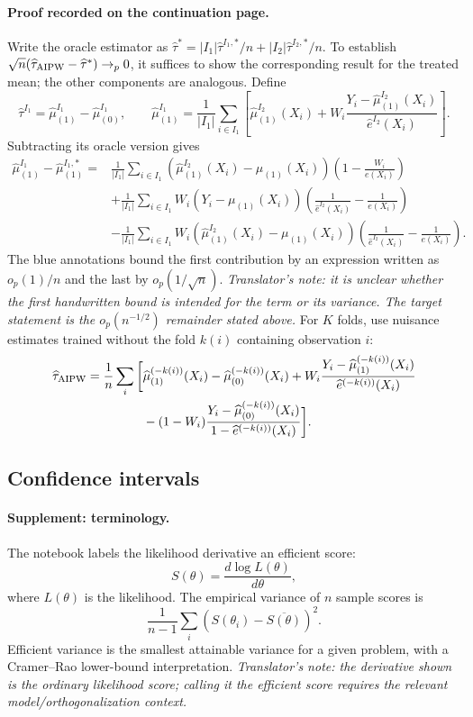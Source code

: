 \paragraph{Proof recorded on the continuation page.}
Write the oracle estimator as
$\widehat\tau^*=|I_1|\widehat\tau^{I_1,*}/n+|I_2|\widehat\tau^{I_2,*}/n$.
To establish $\sqrt n(\widehat\tau_{\rm AIPW}-\widehat\tau^*)\to_p0$, it suffices to show the corresponding result for the treated mean; the other components are analogous. Define
\[
\widehat\tau^{I_1}=\widehat\mu^{I_1}_{(1)}-\widehat\mu^{I_1}_{(0)},\qquad
\widehat\mu^{I_1}_{(1)}=\frac1{|I_1|}\sum_{i\in I_1}
\left[\widehat\mu^{I_2}_{(1)}(X_i)+W_i\frac{Y_i-\widehat\mu^{I_2}_{(1)}(X_i)}{\widehat e^{I_2}(X_i)}\right].
\]
Subtracting its oracle version gives
\begin{align*}
\widehat\mu^{I_1}_{(1)}-\widehat\mu^{I_1,*}_{(1)}
={}&\frac1{|I_1|}\sum_{i\in I_1}
(\widehat\mu^{I_2}_{(1)}(X_i)-\mu_{(1)}(X_i))\left(1-\frac{W_i}{e(X_i)}\right)\\
&+\frac1{|I_1|}\sum_{i\in I_1}W_i(Y_i-\mu_{(1)}(X_i))
\left(\frac1{\widehat e^{I_2}(X_i)}-\frac1{e(X_i)}\right)\\
&-\frac1{|I_1|}\sum_{i\in I_1}W_i(\widehat\mu^{I_2}_{(1)}(X_i)-\mu_{(1)}(X_i))
\left(\frac1{\widehat e^{I_2}(X_i)}-\frac1{e(X_i)}\right).
\end{align*}
The blue annotations bound the first contribution by an expression written as $o_p(1)/n$ and the last by $o_p(1/\sqrt n)$.
\textit{Translator's note: it is unclear whether the first handwritten bound is intended for the term or its variance. The target statement is the $o_p(n^{-1/2})$ remainder stated above.}
For $K$ folds, use nuisance estimates trained without the fold $k(i)$ containing observation $i$:
\begin{align*}
\widehat\tau_{\rm AIPW}=\frac1n\sum_i\bigg[&\widehat\mu_{(1)}^{(-k(i))}(X_i)-\widehat\mu_{(0)}^{(-k(i))}(X_i)
+W_i\frac{Y_i-\widehat\mu_{(1)}^{(-k(i))}(X_i)}{\widehat e^{(-k(i))}(X_i)}\\
&-(1-W_i)\frac{Y_i-\widehat\mu_{(0)}^{(-k(i))}(X_i)}{1-\widehat e^{(-k(i))}(X_i)}\bigg].
\end{align*}
\subsection{Confidence intervals}
\paragraph{Supplement: terminology.}
The notebook labels the likelihood derivative an efficient score:
\[
S(\theta)=\frac{d\log L(\theta)}{d\theta},
\]
where $L(\theta)$ is the likelihood. The empirical variance of $n$ sample scores is
\[
\frac1{n-1}\sum_i(S(\theta_i)-\overline{S(\theta)})^2.
\]
Efficient variance is the smallest attainable variance for a given problem, with a Cramer--Rao lower-bound interpretation.
\textit{Translator's note: the derivative shown is the ordinary likelihood score; calling it the efficient score requires the relevant model/orthogonalization context.}
